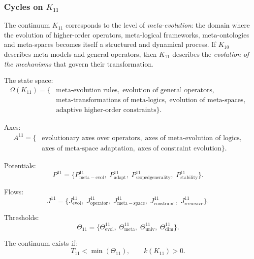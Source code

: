 
\subsubsection{Cycles on $K_{11}$}
\label{sec:cycles-k11}

The continuum $K_{11}$ corresponds to the level of \emph{meta-evolution}:
the domain where the evolution of higher-order operators, meta-logical
frameworks, meta-ontologies and meta-spaces becomes itself a structured and
dynamical process. If $K_{10}$ describes meta-models and general operators,
then $K_{11}$ describes the \emph{evolution of the mechanisms} that govern
their transformation.

The state space:
\[
  \begin{aligned}
  \Omega(K_{11})
  = \{&
    \text{meta-evolution rules},\;
    \text{evolution of general operators},\\
    &\text{meta-transformations of meta-logics},\;
    \text{evolution of meta-spaces},\\
    &\text{adaptive higher-order constraints}
  \}.
  \end{aligned}
\]

Axes:
\[
  \begin{aligned}
  A^{11}
  = \{&
      \text{evolutionary axes over operators},\;
      \text{axes of meta-evolution of logics},\\
      &\text{axes of meta-space adaptation},\;
      \text{axes of constraint evolution}
    \}.
  \end{aligned}
\]

Potentials:
\[
  P^{11}
  = \{
      P^{11}_{\mathrm{meta\!-\!evol}},\;
      P^{11}_{\mathrm{adapt}},\;
      P^{11}_{\mathrm{scoped generality}},\;
      P^{11}_{\mathrm{stability}}
    \}.
\]

Flows:
\[
  J^{11}
  = \{
      J^{11}_{\mathrm{evol}},\;
      J^{11}_{\mathrm{operator}},\;
      J^{11}_{\mathrm{meta\!-\!space}},\;
      J^{11}_{\mathrm{constraint}},\;
      J^{11}_{\mathrm{recursive}}
    \}.
\]

Thresholds:
\[
  \Theta_{11}
   =
   \{
     \Theta^{11}_{\mathrm{evol}},\;
     \Theta^{11}_{\mathrm{meta}},\;
     \Theta^{11}_{\mathrm{univ}},\;
     \Theta^{11}_{\mathrm{dim}}
   \}.
\]

The continuum exists if:
\[
  T_{11} < \min(\Theta_{11}), \qquad k(K_{11})>0.
\]



